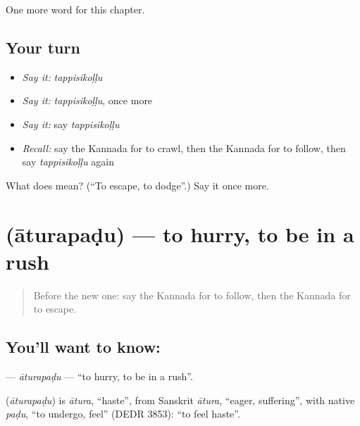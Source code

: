 \begin{grammarlens}[title={What you've built}]
One more word for this chapter.
\end{grammarlens}

\subsection*{Your turn}
\begin{itemize}
\raggedright
  \item \emph{Say it:} \emph{tappisikoḷḷu}
  \item \emph{Say it:} \emph{tappisikoḷḷu}, once more
  \item \emph{Say it:} say \emph{tappisikoḷḷu}
  \item \emph{Recall:} say the Kannada for to crawl, then the Kannada for to follow, then say \emph{tappisikoḷḷu} again
\end{itemize}

\begin{tcolorbox}[breakable,colback=teal!4,colframe=teal!35!black,title={Before you move on}]
What does  mean? (\textquotedblleft{}To escape, to dodge\textquotedblright{}.) Say it once more.
\end{tcolorbox}
\section[\texorpdfstring{\kn{ಆತುರಪಡು} (āturapaḍu)}{ಆತುರಪಡು (āturapaḍu)}]{ (āturapaḍu) — to hurry, to be in a rush}

\label{lesson:KA-C206-aturapadu}



\begin{quote}
Before the new one: say the Kannada for to follow, then the Kannada for to escape.
\end{quote}

\subsection*{You'll want to know: }
\textbf{} — \emph{āturapaḍu} — \textquotedblleft{}to hurry, to be in a rush\textquotedblright{}.

\begin{cousinweb}
\textbf{} (\emph{āturapaḍu}) is \emph{ātura}, \textquotedblleft{}haste\textquotedblright{}, from Sanskrit \emph{ātura}, \textquotedblleft{}eager, suffering\textquotedblright{}, with native \emph{paḍu}, \textquotedblleft{}to undergo, feel\textquotedblright{} (DEDR 3853): \textquotedblleft{}to feel haste\textquotedblright{}.
\end{cousinweb}

